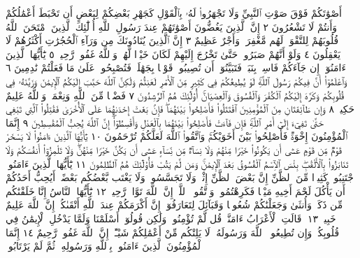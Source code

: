 أَصْوَٰتَكُمْ فَوْقَ صَوْتِ ٱلنَّبِيِّ وَلَا تَجْهَرُوا۟ لَهُۥ بِٱلْقَوْلِ كَجَهْرِ بَعْضِكُمْ
لِبَعْضٍ أَن تَحْبَطَ أَعْمَٰلُكُمْ وَأَنتُمْ لَا تَشْعُرُونَ ٢ إِنَّ ٱلَّذِينَ
يَغُضُّونَ أَصْوَٰتَهُمْ عِندَ رَسُولِ ٱللَّهِ أُو۟لَٰٓئِكَ ٱلَّذِينَ ٱمْتَحَنَ
ٱللَّهُ قُلُوبَهُمْ لِلتَّقْوَىٰۚ لَهُم مَّغْفِرَةࣱ وَأَجْرٌ عَظِيمٌ ٣ إِنَّ ٱلَّذِينَ
يُنَادُونَكَ مِن وَرَآءِ ٱلْحُجُرَٰتِ أَكْثَرُهُمْ لَا يَعْقِلُونَ ٤
وَلَوْ أَنَّهُمْ صَبَرُوا۟ حَتَّىٰ تَخْرُجَ إِلَيْهِمْ لَكَانَ خَيْرࣰا لَّهُمْۚ وَٱللَّهُ غَفُورࣱ
رَّحِيمࣱ ٥ يَٰٓأَيُّهَا ٱلَّذِينَ ءَامَنُوٓا۟ إِن جَآءَكُمْ فَاسِقُۢ بِنَبَإࣲ فَتَبَيَّنُوٓا۟ أَن
تُصِيبُوا۟ قَوْمَۢا بِجَهَٰلَةࣲ فَتُصْبِحُوا۟ عَلَىٰ مَا فَعَلْتُمْ نَٰدِمِينَ ٦
وَٱعْلَمُوٓا۟ أَنَّ فِيكُمْ رَسُولَ ٱللَّهِۚ لَوْ يُطِيعُكُمْ فِي كَثِيرࣲ مِّنَ ٱلْأَمْرِ لَعَنِتُّمْ
وَلَٰكِنَّ ٱللَّهَ حَبَّبَ إِلَيْكُمُ ٱلْإِيمَٰنَ وَزَيَّنَهُۥ فِي قُلُوبِكُمْ وَكَرَّهَ
إِلَيْكُمُ ٱلْكُفْرَ وَٱلْفُسُوقَ وَٱلْعِصْيَانَۚ أُو۟لَٰٓئِكَ هُمُ ٱلرَّٰشِدُونَ ٧
فَضْلࣰا مِّنَ ٱللَّهِ وَنِعْمَةࣰۚ وَٱللَّهُ عَلِيمٌ حَكِيمࣱ ٨ وَإِن طَآئِفَتَانِ
مِنَ ٱلْمُؤْمِنِينَ ٱقْتَتَلُوا۟ فَأَصْلِحُوا۟ بَيْنَهُمَاۖ فَإِنۢ بَغَتْ إِحْدَىٰهُمَا
عَلَى ٱلْأُخْرَىٰ فَقَٰتِلُوا۟ ٱلَّتِي تَبْغِي حَتَّىٰ تَفِيٓءَ إِلَىٰٓ أَمْرِ ٱللَّهِۚ فَإِن فَآءَتْ
فَأَصْلِحُوا۟ بَيْنَهُمَا بِٱلْعَدْلِ وَأَقْسِطُوٓا۟ۖ إِنَّ ٱللَّهَ يُحِبُّ ٱلْمُقْسِطِينَ ٩
إِنَّمَا ٱلْمُؤْمِنُونَ إِخْوَةࣱ فَأَصْلِحُوا۟ بَيْنَ أَخَوَيْكُمْۚ وَٱتَّقُوا۟ ٱللَّهَ
لَعَلَّكُمْ تُرْحَمُونَ ١٠ يَٰٓأَيُّهَا ٱلَّذِينَ ءَامَنُوا۟ لَا يَسْخَرْ قَوْمࣱ مِّن قَوْمٍ
عَسَىٰٓ أَن يَكُونُوا۟ خَيْرࣰا مِّنْهُمْ وَلَا نِسَآءࣱ مِّن نِّسَآءٍ عَسَىٰٓ أَن يَكُنَّ خَيْرࣰا
مِّنْهُنَّۖ وَلَا تَلْمِزُوٓا۟ أَنفُسَكُمْ وَلَا تَنَابَزُوا۟ بِٱلْأَلْقَٰبِۖ بِئْسَ ٱلِٱسْمُ
ٱلْفُسُوقُ بَعْدَ ٱلْإِيمَٰنِۚ وَمَن لَّمْ يَتُبْ فَأُو۟لَٰٓئِكَ هُمُ ٱلظَّٰلِمُونَ ١١
يَٰٓأَيُّهَا ٱلَّذِينَ ءَامَنُوا۟ ٱجْتَنِبُوا۟ كَثِيرࣰا مِّنَ ٱلظَّنِّ إِنَّ بَعْضَ ٱلظَّنِّ
إِثْمࣱۖ وَلَا تَجَسَّسُوا۟ وَلَا يَغْتَب بَّعْضُكُم بَعْضًاۚ أَيُحِبُّ أَحَدُكُمْ أَن
يَأْكُلَ لَحْمَ أَخِيهِ مَيْتࣰا فَكَرِهْتُمُوهُۚ وَٱتَّقُوا۟ ٱللَّهَۚ إِنَّ ٱللَّهَ
تَوَّابࣱ رَّحِيمࣱ ١٢ يَٰٓأَيُّهَا ٱلنَّاسُ إِنَّا خَلَقْنَٰكُم مِّن ذَكَرࣲ وَأُنثَىٰ وَجَعَلْنَٰكُمْ
شُعُوبࣰا وَقَبَآئِلَ لِتَعَارَفُوٓا۟ۚ إِنَّ أَكْرَمَكُمْ عِندَ ٱللَّهِ أَتْقَىٰكُمْۚ إِنَّ ٱللَّهَ
عَلِيمٌ خَبِيرࣱ ١٣۞ قَالَتِ ٱلْأَعْرَابُ ءَامَنَّاۖ قُل لَّمْ تُؤْمِنُوا۟ وَلَٰكِن
قُولُوٓا۟ أَسْلَمْنَا وَلَمَّا يَدْخُلِ ٱلْإِيمَٰنُ فِي قُلُوبِكُمْۖ وَإِن تُطِيعُوا۟ ٱللَّهَ
وَرَسُولَهُۥ لَا يَلِتْكُم مِّنْ أَعْمَٰلِكُمْ شَيْـًٔاۚ إِنَّ ٱللَّهَ غَفُورࣱ رَّحِيمٌ ١٤
إِنَّمَا ٱلْمُؤْمِنُونَ ٱلَّذِينَ ءَامَنُوا۟ بِٱللَّهِ وَرَسُولِهِۦ ثُمَّ لَمْ يَرْتَابُوا۟
